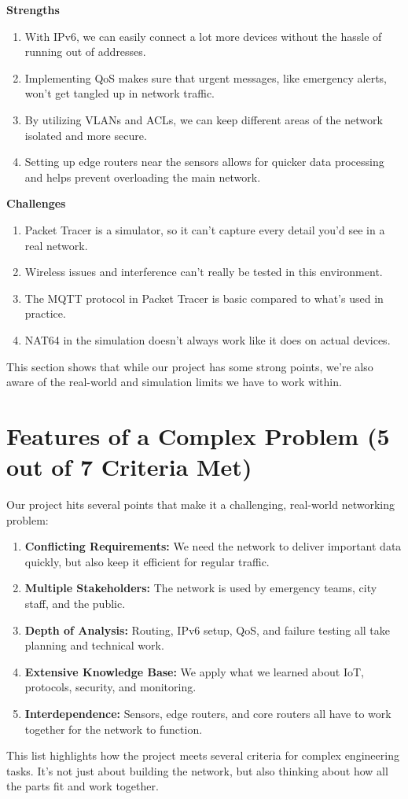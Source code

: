 \documentclass[12pt,a4paper]{article}
\begin{document}
\textbf{Strengths}
\begin{enumerate}[label=4.\arabic*, nosep]
    \item With IPv6, we can easily connect a lot more devices without the hassle of running out of addresses.
    \item Implementing QoS makes sure that urgent messages, like emergency alerts, won’t get tangled up in network traffic.
    \item By utilizing VLANs and ACLs, we can keep different areas of the network isolated and more secure.
    \item Setting up edge routers near the sensors allows for quicker data processing and helps prevent overloading the main network.
\end{enumerate}
\textbf{Challenges}
\begin{enumerate}[label=4.\arabic*, nosep]
    \item Packet Tracer is a simulator, so it can’t capture every detail you’d see in a real network.
    \item Wireless issues and interference can’t really be tested in this environment.
    \item The MQTT protocol in Packet Tracer is basic compared to what’s used in practice.
    \item NAT64 in the simulation doesn’t always work like it does on actual devices.
\end{enumerate}
This section shows that while our project has some strong points, we’re also aware of the real-world and simulation limits we have to work within.

\vspace{1em}

\section*{Features of a Complex Problem (5 out of 7 Criteria Met)}
Our project hits several points that make it a challenging, real-world networking problem:
\begin{enumerate}[label=5.\arabic*, nosep]
    \item \textbf{Conflicting Requirements:} We need the network to deliver important data quickly, but also keep it efficient for regular traffic.
    \item \textbf{Multiple Stakeholders:} The network is used by emergency teams, city staff, and the public.
    \item \textbf{Depth of Analysis:} Routing, IPv6 setup, QoS, and failure testing all take planning and technical work.
    \item \textbf{Extensive Knowledge Base:} We apply what we learned about IoT, protocols, security, and monitoring.
    \item \textbf{Interdependence:} Sensors, edge routers, and core routers all have to work together for the network to function.
\end{enumerate}
This list highlights how the project meets several criteria for complex engineering tasks. It’s not just about building the network, but also thinking about how all the parts fit and work together.
\end{document}
